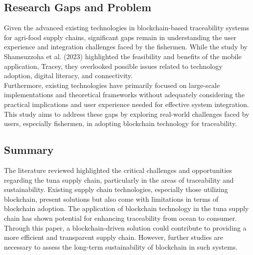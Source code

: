 \subsection{Research Gaps and Problem}

Given the advanced existing technologies in blockchain-based traceability systems for agri-food supply chains, significant gaps remain in understanding the user experience and integration challenges faced by the fishermen. While the study by Shamsuzzoha et al. (2023) highlighted the feasibility and benefits of the mobile application, Tracey, they overlooked possible issues related to technology adoption, digital literacy, and connectivity. \\[1em]
Furthermore, existing technologies have primarily focused on large-scale implementations and theoretical frameworks without adequately considering the practical implications and user experience needed for effective system integration. This study aims to address these gaps by exploring real-world challenges faced by users, especially fishermen, in adopting blockchain technology for traceability.

\subsection{Summary}

The literature reviewed highlighted the critical challenges and opportunities regarding the tuna supply chain, particularly in the areas of traceability and sustainability. Existing supply chain technologies, especially those utilizing blockchain, present solutions but also come with limitations in terms of blockchain adoption. The application of blockchain technology in the tuna supply chain has shown potential for enhancing traceability from ocean to consumer. \\[1em]
Through this paper, a blockchain-driven solution could contribute to providing a more efficient and transparent supply chain. However, further studies are necessary to assess the long-term sustainability of blockchain in such systems.













